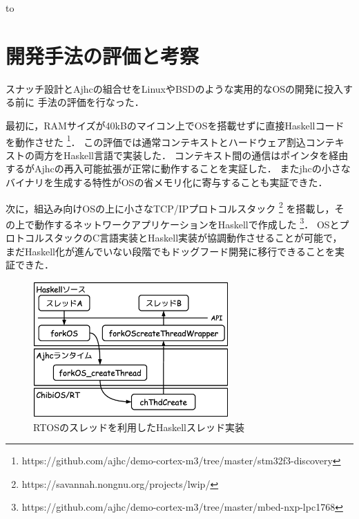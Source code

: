 \documentclass[submit,techreq,noauthor]{ipsj}
\begin{document}
\begin{table}[tb]
\caption{``hoge''と印字するプログラムに見るコンパイラの特性}
\label{tab:compilerlist}
\hbox to
\end{table}

\section{開発手法の評価と考察}

スナッチ設計とAjhcの組合せをLinuxやBSDのような実用的なOSの開発に投入する前に
手法の評価を行なった．

最初に，RAMサイズが40kBのマイコン上でOSを搭載せずに直接Haskellコードを動作させた
\footnote{https://github.com/ajhc/demo-cortex-m3/tree/master/stm32f3-discovery}．
この評価では通常コンテキストとハードウェア割込コンテキストの両方をHaskell言語で実装した．
コンテキスト間の通信はポインタを経由するがAjhcの再入可能拡張が正常に動作することを実証した．
またjhcの小さなバイナリを生成する特性がOSの省メモリ化に寄与することも実証できた．

次に，組込み向けOSの上に小さなTCP/IPプロトコルスタック
\footnote{https://savannah.nongnu.org/projects/lwip/}
を搭載し，その上で動作するネットワークアプリケーションをHaskellで作成した
\footnote{https://github.com/ajhc/demo-cortex-m3/tree/master/mbed-nxp-lpc1768}．
OSとプロトコルスタックのC言語実装とHaskell実装が協調動作させることが可能で，
まだHaskell化が進んでいない段階でもドッグフード開発に移行できることを実証できた．

\begin{figure}[h]
\centering
\includegraphics[width=75mm]{draw/chibi_thr.eps}
\caption{RTOSのスレッドを利用したHaskellスレッド実装}
\label{fig:forkos}
\end{figure}
\end{document}
